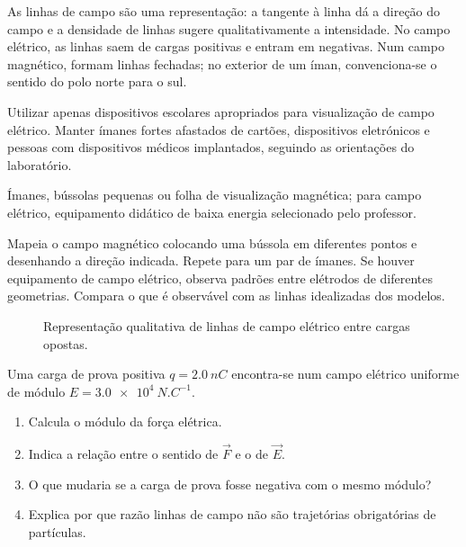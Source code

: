 \documentclass[11pt,a4paper,openany]{book}
\newcounter{exercicio}[chapter]
\renewcommand{\theexercicio}{\thechapter.\arabic{exercicio}}
\newenvironment{exercicio}[1][]%
{\refstepcounter{exercicio}%
\begin{tcolorbox}[breakable,colback=white,colframe=eublue!70,
 title={Exercício \theexercicio\if\relax\detokenize{#1}\relax\else\ --- #1\fi},fonttitle=\bfseries]}%
{\end{tcolorbox}}
\begin{document}
\begin{fundamento}
As linhas de campo são uma representação: a tangente à linha dá a direção do campo e a densidade de linhas sugere qualitativamente a intensidade. No campo elétrico, as linhas saem de cargas positivas e entram em negativas. Num campo magnético, formam linhas fechadas; no exterior de um íman, convenciona-se o sentido do polo norte para o sul.
\end{fundamento}

\begin{seguranca}
Utilizar apenas dispositivos escolares apropriados para visualização de campo elétrico. Manter ímanes fortes afastados de cartões, dispositivos eletrónicos e pessoas com dispositivos médicos implantados, seguindo as orientações do laboratório.
\end{seguranca}

\begin{material}
Ímanes, bússolas pequenas ou folha de visualização magnética; para campo elétrico, equipamento didático de baixa energia selecionado pelo professor.
\end{material}

\begin{metodo}
Mapeia o campo magnético colocando uma bússola em diferentes pontos e desenhando a direção indicada. Repete para um par de ímanes. Se houver equipamento de campo elétrico, observa padrões entre elétrodos de diferentes geometrias. Compara o que é observável com as linhas idealizadas dos modelos.
\end{metodo}

\begin{figure}[H]
\centering
{}
\caption{Representação qualitativa de linhas de campo elétrico entre cargas opostas.}
\end{figure}

\begin{exercicio}[Campo e força]
Uma carga de prova positiva $q=\SI{2.0}{nC}$ encontra-se num campo elétrico uniforme de módulo $E=\SI{3.0e4}{N.C^{-1}}$.
\begin{enumerate}[label=\alph*)]
\item Calcula o módulo da força elétrica.
\item Indica a relação entre o sentido de $\vec F$ e o de $\vec E$.
\item O que mudaria se a carga de prova fosse negativa com o mesmo módulo?
\item Explica por que razão linhas de campo não são trajetórias obrigatórias de partículas.
\end{enumerate}
\end{exercicio}
\end{document}
